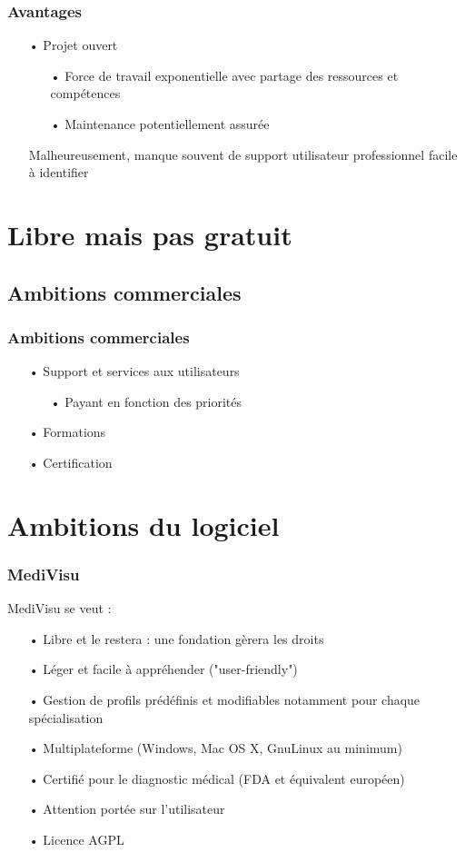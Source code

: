 \documentclass[11pt]{beamer}
\begin{document}
\begin{frame}
\frametitle{Avantages}
\begin{itemize}[<+->]
\item[•] Projet ouvert
\begin{itemize}
\item[•] Force de travail exponentielle avec partage des ressources et compétences
\item[•] Maintenance potentiellement assurée
\end{itemize}
\item [] Malheureusement, manque souvent de support utilisateur professionnel facile à identifier
\end{itemize}
\end{frame}

\section{Libre mais pas gratuit}

\subsection{Ambitions commerciales}

\begin{frame}
\frametitle{Ambitions commerciales}
\begin{itemize}[<+->]
\item[•] Support et services aux utilisateurs
\begin{itemize}[<+->]
\item[•] Payant en fonction des priorités
\end{itemize}
\item[•] Formations
\item[•] Certification
\end{itemize}
\end{frame}

\section{Ambitions du logiciel}

\begin{frame}
\frametitle{MediVisu}
MediVisu se veut :
\begin{itemize}[<+->]
\item[•] Libre et le restera : une fondation gèrera les droits
\item[•] Léger et facile à appréhender ("user-friendly")
\item[•] Gestion de profils prédéfinis et modifiables notamment pour chaque spécialisation
\item[•] Multiplateforme (Windows, Mac OS X, GnuLinux au minimum)
\item[•] Certifié pour le diagnostic médical (FDA et équivalent européen)
\item[•] Attention portée sur l'utilisateur
\item[•] Licence AGPL
\end{itemize}
\end{frame}
\end{document}

